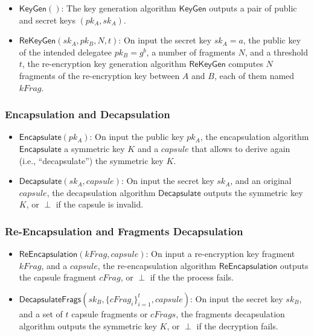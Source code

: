 \documentclass{amsart}
\providecommand{\pk}[1]{pk_{#1}}
\providecommand{\sk}[1]{sk_{#1}}
\begin{document}
\begin{itemize}

	\item $\mathsf{KeyGen}()$: The key generation algorithm $\mathsf{KeyGen}$ outputs a pair of public and secret keys $(\pk{A}, \sk{A})$.
	\item $\mathsf{ReKeyGen}(sk_A, pk_B, N, t)$: On input the secret key $sk_{A} = a$, the public key of the intended delegatee $pk_{B} = g^b$, a number of fragments $N$, and a threshold $t$, the re-encryption key generation algorithm $\mathsf{ReKeyGen}$ computes $N$ fragments of the re-encryption key between $A$ and $B$, each of them named $kFrag$. 
\end{itemize}


\subsubsection{Encapsulation and Decapsulation}

\begin{itemize}
	\item $\mathsf{Encapsulate}(pk_A)$: On input the public key $pk_A$, the encapsulation algorithm $\mathsf{Encapsulate}$ a symmetric key $K$ and a $capsule$ that allows to derive again (i.e., ``decapsulate'') the symmetric key $K$. 
	
	\item $\mathsf{Decapsulate}(sk_A, capsule)$: On input the secret key $sk_A$, and an original $capsule$, the decapsulation algorithm $\mathsf{Decapsulate}$ outputs the symmetric key $K$, or $\perp$ if the capsule is invalid. 

	
\end{itemize}

\subsubsection{Re-Encapsulation and Fragments Decapsulation}%

\begin{itemize}
\item $\mathsf{ReEncapsulation}(kFrag, capsule)$: On input a re-encryption key fragment $kFrag$, and a $capsule$, the re-encapsulation algorithm $\mathsf{ReEncapsulation}$ outputs the capsule fragment $cFrag$, or $\perp$ if the the process fails.

	\item $\mathsf{DecapsulateFrags}(sk_B, \{cFrag_i\}_{i=1}^t, capsule)$: On input the secret key $sk_B$, and a set of $t$ capsule fragments or $cFrags$, the fragments decapsulation algorithm outputs the symmetric key $K$, or $\perp$ if the decryption fails. 

\end{itemize}
\end{document}
